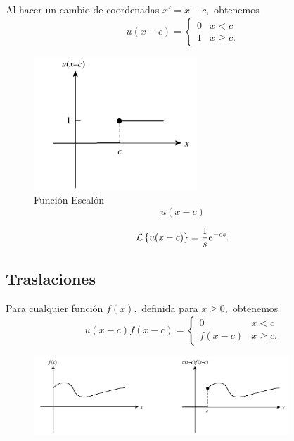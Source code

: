 	Al hacer un cambio de coordenadas $x'=x-c,$ obtenemos
	$$
	u(x-c)=\begin{cases}
	0 & x<c\\
	1 & x\geq c.
	\end{cases}
	$$



	\begin{figure}
		\centering
		\includegraphics[height=5cm,keepaspectratio=true]{./edo/img0402.png}
		\caption{Función Escalón $$u(x-c)$$}
		\label{fig:0402}
	\end{figure}
	



	\begin{thm}
		\label{bron:thm:23.3}
		$$
		\mathcal{L}\left\{ u(x-c) \right\}=\dfrac{1}{s}e^{-cs}.
		$$
	\end{thm}


\subsection{Traslaciones}


	Para cualquier funci\'on $f(x),$ definida para $x\geq0,$ obtenemos
	$$
	u(x-c)f(x-c)=
	\begin{cases}
	0 & x<c \\
	f(x-c) & x\geq c.
	\end{cases}
	$$



	\begin{figure}
		\centering
		\includegraphics[height=3cm,keepaspectratio=true]{./edo/img0403.png}
		\label{fig:0403}
	\end{figure}
	



